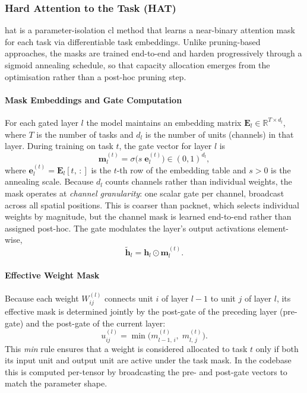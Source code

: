 \subsubsection{Hard Attention to the Task (HAT)}

\gls{hat} \cite{ll_hat_2018} is a parameter-isolation \gls{cl} method that
learns a near-binary attention mask for each task via differentiable task
embeddings. Unlike pruning-based approaches, the masks are trained end-to-end
and harden progressively through a sigmoid annealing schedule, so that capacity
allocation emerges from the optimisation rather than a post-hoc pruning step.

\paragraph{Mask Embeddings and Gate Computation}

For each gated layer $l$ the model maintains an embedding matrix
$\mathbf{E}_l \in \mathbb{R}^{T \times d_l}$, where $T$ is the number of tasks
and $d_l$ is the number of units (channels) in that layer. During training on
task $t$, the gate vector for layer $l$ is
%
\begin{equation}\label{eqn:hat_gate}
    \mathbf{m}_l^{(t)}
    =
    \sigma\!\bigl(s\;\mathbf{e}_l^{(t)}\bigr)
    \in (0,1)^{d_l} ,
\end{equation}
%
where $\mathbf{e}_l^{(t)} = \mathbf{E}_l[t,\,:]$ is the $t$-th row of the
embedding table and $s > 0$ is the annealing scale. Because $d_l$ counts
channels rather than individual weights, the mask operates at
\emph{channel granularity}: one scalar gate per channel, broadcast across all
spatial positions. This is coarser than \gls{packnet}, which selects individual
weights by magnitude, but the channel mask is learned end-to-end rather than
assigned post-hoc. The gate modulates the
layer's output activations element-wise,
%
\begin{equation}\label{eqn:hat_apply}
    \tilde{\mathbf{h}}_l = \mathbf{h}_l \odot \mathbf{m}_l^{(t)} .
\end{equation}

\paragraph{Effective Weight Mask}

Because each weight $W_{ij}^{(l)}$ connects unit $i$ of layer $l{-}1$ to unit
$j$ of layer $l$, its effective mask is determined jointly by the post-gate of
the preceding layer (pre-gate) and the post-gate of the current layer:
%
\begin{equation}\label{eqn:hat_weight_mask}
    u_{ij}^{(l)}
    =
    \min\!\bigl(m_{l-1,\,i}^{(t)},\; m_{l,\,j}^{(t)}\bigr) .
\end{equation}
%
This \emph{min} rule ensures that a weight is considered allocated to task $t$
only if both its input unit and output unit are active under the task mask. In the
codebase this is computed per-tensor by broadcasting the pre- and post-gate
vectors to match the parameter shape.

